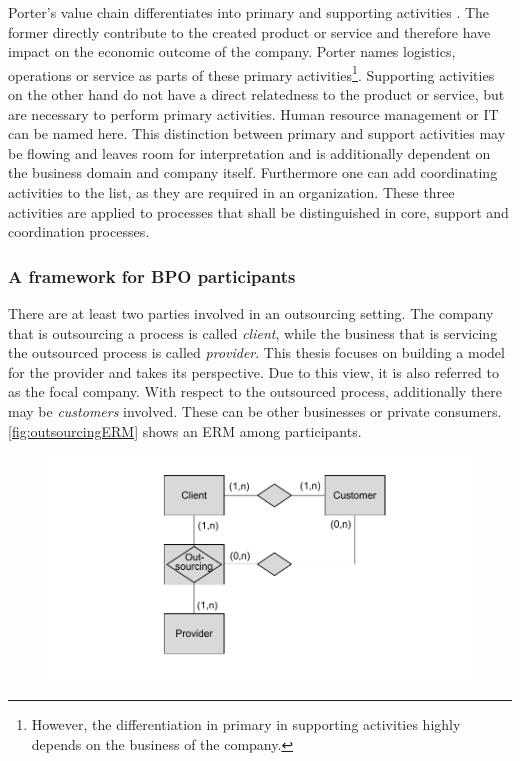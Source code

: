 	Porter's value chain differentiates into primary and supporting activities \citep{porter1985}. The former directly contribute to the created product or service and therefore have impact on the economic outcome of the company. Porter names logistics, operations or service as parts of these primary activities\footnote{However, the differentiation in primary in supporting activities highly depends on the business of the company.}. Supporting activities on the other hand do not have a direct relatedness to the product or service, but are necessary to perform primary activities. Human resource management or IT can be named here. This distinction between primary and support activities may be flowing and leaves room for interpretation and is additionally dependent on the business domain and company itself. Furthermore one can add coordinating activities to the list, as they are required in an organization. These three activities are applied to processes that shall be distinguished in core, support and coordination processes. 
	 
		\subsubsection{A framework for BPO participants}
		\label{sec:frameworkbpo}
	There are at least two parties involved in an outsourcing setting. The company that is outsourcing a process is called \textit{client}, while the business that is servicing the outsourced process is called \textit{provider}. This thesis focuses on building a model for the provider and takes its perspective. Due to this view, it is also referred to as the focal company. With respect to the outsourced process, additionally there may be \textit{customers} involved. These can be other businesses or private consumers.  \Fig \ref{fig:outsourcingERM} shows an \acrfull{ERM} \citep{Chen:1976:ERM} among participants.
			\begin{figure}[caption={Outsourcing ERM}, label={fig:outsourcingERM}]
		{	\includegraphics[width=.8\textwidth]{figures/outsourcingERM.pdf}}
	\end{figure}
	
